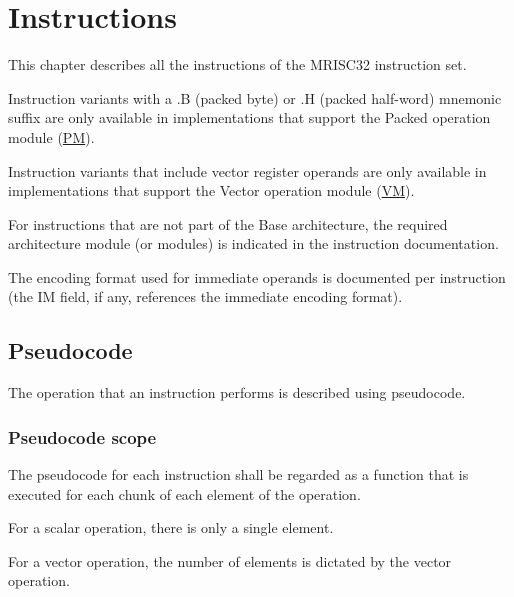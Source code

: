 %

\chapter{Instructions}

This chapter describes all the instructions of the MRISC32 instruction set.

Instruction variants with a .B (packed byte) or .H (packed half-word) mnemonic
suffix are only available in implementations that support the Packed operation
module (\hyperref[module:PM]{PM}).

Instruction variants that include vector register operands are only available
in implementations that support the Vector operation module
(\hyperref[module:VM]{VM}).

For instructions that are not part of the Base architecture, the required
architecture module (or modules) is indicated in the instruction documentation.

The encoding format used for immediate operands is documented per instruction
(the IM field, if any, references the immediate encoding format).

\section{Pseudocode}

The operation that an instruction performs is described using pseudocode.

\subsection{Pseudocode scope}

The pseudocode for each instruction shall be regarded as a function that is
executed for each chunk of each element of the operation.

For a scalar operation, there is only a single element.

For a vector operation, the number of elements is dictated by the vector
operation.

